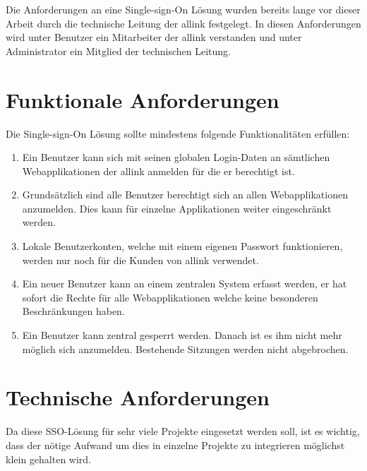 Die Anforderungen an eine Single-sign-On Lösung wurden bereits lange vor dieser Arbeit durch die technische Leitung der allink festgelegt. In diesen Anforderungen wird unter Benutzer ein Mitarbeiter der allink verstanden und unter Administrator ein Mitglied der technischen Leitung.

\section{Funktionale Anforderungen}
\label{sec:funktionale_anforderungen}
Die Single-sign-On Lösung sollte mindestens folgende Funktionalitäten erfüllen:
\begin{enumerate}
  \item Ein Benutzer kann sich mit seinen globalen Login-Daten an sämtlichen Webapplikationen der allink anmelden für die er berechtigt ist.
  \item Grundsätzlich sind alle Benutzer berechtigt sich an allen Webapplikationen anzumelden. Dies kann für einzelne Applikationen weiter eingeschränkt werden.
  \item Lokale Benutzerkonten, welche mit einem eigenen Passwort funktionieren, werden nur noch für die Kunden von allink verwendet.
  \item Ein neuer Benutzer kann an einem zentralen System erfasst werden, er hat sofort die Rechte für alle Webapplikationen welche keine besonderen Beschränkungen haben.
  \item Ein Benutzer kann zentral gesperrt werden. Danach ist es ihm nicht mehr möglich sich anzumelden. Bestehende Sitzungen werden nicht abgebrochen.
\end{enumerate}

\section{Technische Anforderungen}
\label{sec:technische_anforderungen}
Da diese SSO-Lösung für sehr viele Projekte eingesetzt werden soll, ist es wichtig, dass der nötige Aufwand um dies in einzelne Projekte zu integrieren möglichst klein gehalten wird.